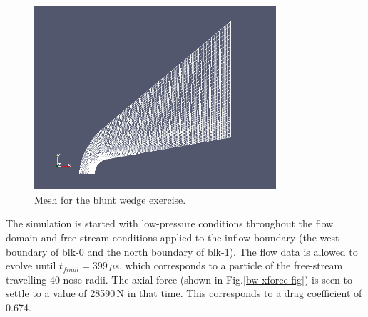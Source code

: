 \begin{figure}[htbp]
\begin{center}
\includegraphics[width=0.8\textwidth]{../2D/blunt-wedge/bw-mesh.png}
\end{center}
\caption{Mesh for the blunt wedge exercise.}
\label{bw-mesh-fig}
\end{figure}

\medskip
The simulation is started with low-pressure conditions throughout the flow
domain and free-stream conditions applied to the inflow boundary
(the west boundary of blk-0 and the north boundary of blk-1).
The flow data is allowed to evolve until $t_{final} = 399\,\mu$s,
which corresponds to a particle of the free-stream travelling 40 nose radii.
The axial force (shown in Fig.\ref{bw-xforce-fig}) is seen to settle to 
a value of 28590\,N in that time.
This corresponds to a drag coefficient of 0.674.

